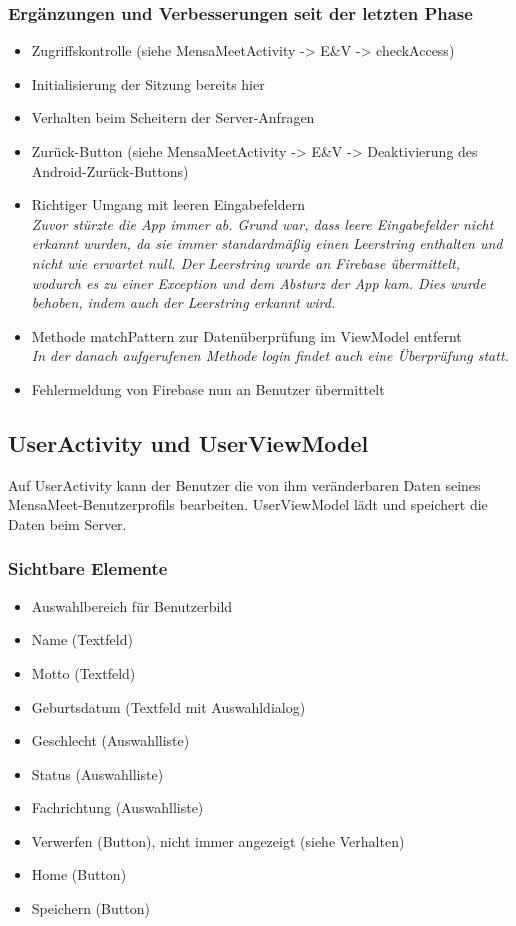 \documentclass[a4paper]{scrreprt}
\begin{document}
\subsubsection{Ergänzungen und Verbesserungen seit der letzten Phase}
\begin{itemize}
\item Zugriffskontrolle (siehe MensaMeetActivity -> E\&V -> checkAccess)
\item Initialisierung der Sitzung bereits hier
\item Verhalten beim Scheitern der Server-Anfragen
\item Zurück-Button (siehe MensaMeetActivity -> E\&V -> Deaktivierung des Android-Zurück-Buttons)
\item Richtiger Umgang mit leeren Eingabefeldern\\
\textit{Zuvor stürzte die App immer ab. Grund war, dass leere Eingabefelder nicht erkannt wurden, da sie immer standardmäßig einen Leerstring enthalten und nicht wie erwartet null. Der Leerstring wurde an Firebase übermittelt, wodurch es zu einer Exception und dem Absturz der App kam. Dies wurde behoben, indem auch der Leerstring erkannt wird.}
\item Methode matchPattern zur Datenüberprüfung im ViewModel entfernt\\
\textit{In der danach aufgerufenen Methode login findet auch eine Überprüfung statt.}
\item Fehlermeldung von Firebase nun an Benutzer übermittelt

\end{itemize}

\subsection{UserActivity und UserViewModel}
Auf UserActivity kann der Benutzer die von ihm veränderbaren Daten seines MensaMeet-Benutzerprofils bearbeiten. UserViewModel lädt und speichert die Daten beim Server. 

\subsubsection{Sichtbare Elemente}

\begin{itemize}
\item Auswahlbereich für Benutzerbild
\item Name (Textfeld)
\item Motto (Textfeld)
\item Geburtsdatum (Textfeld mit Auswahldialog)
\item Geschlecht (Auswahlliste)
\item Status (Auswahlliste)
\item Fachrichtung (Auswahlliste)
\item Verwerfen (Button), nicht immer angezeigt (siehe Verhalten)
\item Home (Button) 
\item Speichern (Button)

\end{itemize}
\end{document}
